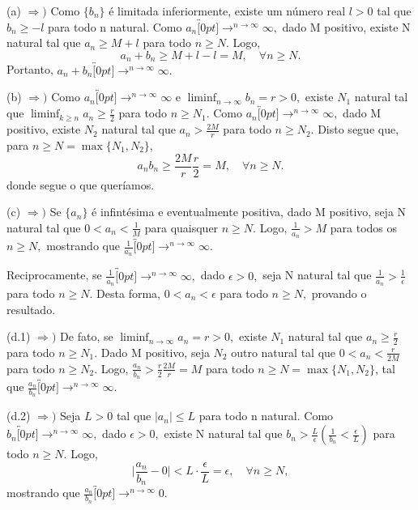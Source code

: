 \documentclass[analysis_notes.tex]{subfiles}
\begin{document}
\begin{proof*}
	(a) $\Rightarrow)$ Como $\{b_{n}\}$ \'e limitada inferiormente, existe um n\'umero real $l > 0$ tal que $b_{n} \geq{ -l}$ para todo
	n natural. Como $a_{n}\overbracket[0pt]{\longrightarrow}^{n\to \infty}\infty,$ dado M positivo, existe N natural tal que
	$a_{n}\geq{M}+l$ para todo $n\geq{N}.$ Logo,
	$$
		a_{n} + b_{n}\geq{M+l-l} = M,\quad \forall n\geq{N}.
	$$
	Portanto, $a_{n} + b_{n}\overbracket[0pt]{\longrightarrow}^{n\to \infty}\infty.$

	(b) $\Rightarrow)$ Como $a_{n}\overbracket[0pt]{\longrightarrow}^{n\to \infty}\infty$ e $\liminf_{n\to\infty}b_{n} = r > 0,$
	existe $N_{1}$ natural tal que $\liminf_{k\geq{n}}a_{n} \geq{\frac{r}{2}}$ para todo $n\geq{N_{1}.}$ Como $a_{n}\overbracket[0pt]{\longrightarrow}^{n\to \infty}\infty,$
	dado M positivo, existe $N_{2}$ natural tal que $a_{n} > \frac{2M}{r}$ para todo $n\geq{N_{2}}.$ Disto segue que, para $n\geq{N = \max\{N_{1}, N_{2}\}}$,
	$$
		a_{n}b_{n}\geq{\frac{2M}{r}\frac{r}{2}} = M,\quad \forall n\geq{N}.
	$$
	donde segue o que quer\'iamos.

	(c) $\Rightarrow)$ Se $\{a_{n}\}$ \'e infint\'esima e eventualmente positiva, dado M positivo, seja N natural tal que
	$0 < a_{n} < \frac{1}{M}$ para quaisquer $n\geq{N}.$ Logo, $\frac{1}{a_{n}} > M$ para todos os $n\geq{N},$ mostrando que
	$\frac{1}{a_{n}}\overbracket[0pt]{\longrightarrow}^{n\to \infty}\infty.$

	Reciprocamente, se $\frac{1}{a_{n}}\overbracket[0pt]{\longrightarrow}^{n\to \infty}\infty,$ dado $\epsilon > 0,$ seja N natural tal que
	$\frac{1}{a_{n}} > \frac{1}{\epsilon}$ para todo $n\geq{N}.$ Desta forma, $0 < a_{n} < \epsilon $ para todo $n\geq{N},$ provando o
	resultado.

	(d.1) $\Rightarrow)$ De fato, se $\liminf_{n\to\infty}a_{n} = r > 0,$ existe $N_{1}$ natural tal que $a_{n}\geq{\frac{r}{2}}$ para todo $n\geq{N_{1}.}$
	Dado M positivo, seja $N_{2}$ outro natural tal que $0 < a_{n} < \frac{r}{2M}$ para todo $n\geq{N_{2}}.$ Logo, $\frac{a_{n}}{b_{n}}>\frac{r}{2}\frac{2M}{r} = M$
	para todo $n\geq{N} = \max\{N_{1}, N_{2}\}$, tal que $\frac{a_{n}}{b_{n}}\overbracket[0pt]{\longrightarrow}^{n\to \infty}\infty$.

	(d.2) $\Rightarrow)$ Seja $L > 0 $ tal que $|a_{n}|\leq{L}$ para todo n natural. Como $b_{n}\overbracket[0pt]{\longrightarrow}^{n\to \infty}\infty,$
	dado $\epsilon > 0,$ existe N natural tal que $b_{n} > \frac{L}{\epsilon}(\frac{1}{b_{n}} < \frac{\epsilon}{L})$ para todo $n\geq{N}.$ Logo,
	$$
		\biggl|\frac{a_{n}}{b_{n}} - 0\biggr| < L \cdot \frac{\epsilon}{L} = \epsilon,\quad \forall n\geq{N},
	$$
	mostrando que $\frac{a_{n}}{b_{n}}\overbracket[0pt]{\longrightarrow}^{n\to \infty}0.$\qedsymbol
\end{proof*}
\end{document}

